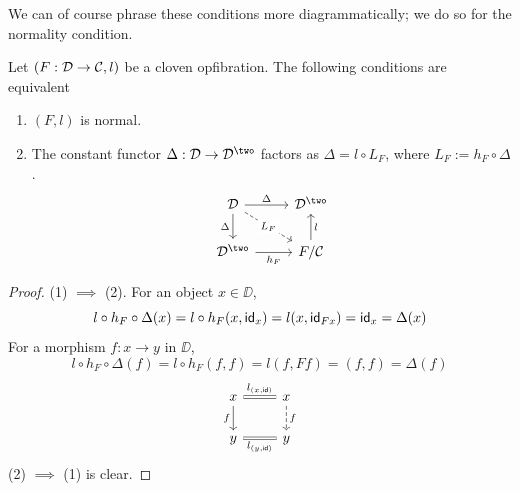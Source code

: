 We can of course phrase these conditions more diagrammatically;
we do so for the normality condition.
\begin{proposition}\label{prop:normal-opfibration-equiv-defs}
  Let $(F : \mathcal{D} \to \mathcal{C}, l)$ be a cloven opfibration.
  The following conditions are equivalent
  \begin{enumerate}
    \item $(F,l)$ is normal.
    \item The constant functor $\Delta : \DD \to \DD^\two$
      factors as $\Delta = l \circ L_F$, where
      $L_F := h_F \circ \Delta$.
      \[ \begin{tikzcd}
        \DD & {\DD^\two} \\
        {\DD^\two} & {F / \CC}
        \arrow["\Delta", from=1-1, to=1-2]
        \arrow["\Delta"', from=1-1, to=2-1]
        \arrow["{L_F}"{description}, dashed, from=1-1, to=2-2]
        \arrow["{{h_F}}"', from=2-1, to=2-2]
        \arrow["l"', from=2-2, to=1-2]
      \end{tikzcd} \]
  \end{enumerate}
\end{proposition}
\begin{proof}
  (1) $\implies$ (2).
  For an object $x \in \DD$,
  \[l \circ h_F \circ \Delta (x) = l \circ h_F (x,\mathsf{id}_x) = l (x, \mathsf{id}_{F x}) = \mathsf{id}_x = \Delta (x)\]  
  For a morphism $f : x \to y$ in $\DD$,
  \[l \circ h_F \circ \Delta (f) = l \circ h_F (f, f) = l (f, F f) = (f,f) = \Delta (f)\]
  \[ \begin{tikzcd}
    x & x \\
    y & y
    \arrow["{l_{(x,\id)}}", equals, from=1-1, to=1-2]
    \arrow["f"', from=1-1, to=2-1]
    \arrow["f", dashed, from=1-2, to=2-2]
    \arrow["{l_{(y,\id)}}"', equals, from=2-1, to=2-2]
  \end{tikzcd}\]
  (2) $\implies$ (1) is clear.
\end{proof}

